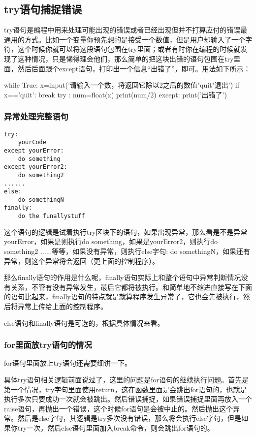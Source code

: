\documentclass[12pt,oneside]{book}
\begin{document}
\begin{common-format}
\subsection{try语句捕捉错误}
try语句是编程中用来处理可能出现的错误或者已经出现但并不打算应付的错误最通用的方式。比如一个变量你预先想的是接受一个数值，但是用户却输入了一个字符，这个时候你就可以将这段语句包围在try里面；或者有时你在编程的时候就发现了这种情况，只是懒得理会他们，那么简单的把这块出错的语句包围在try里面，然后后面跟个except语句，打印出一个信息“出错了”，即可。用法如下所示：
\begin{tcbpython}
while True:
    x=input('请输入一个数，将返回它除以2之后的数值"quit"退出\n')
    if x=='quit':
        break
    try :
        num=float(x)
        print(num/2)
    except:
        print('出错了')
\end{tcbpython}

\subsubsection{异常处理完整语句}
\begin{Verbatim}
try:
    yourCode
except yourError:
    do something
except yourError2:
    do something2
......
else:
    do somethingN
finally:
    do the funallystuff
\end{Verbatim}

这个语句的逻辑是试着执行try区块下的语句，如果出现异常，那么看是不是异常yourError，如果是则执行do something，如果是yourError2，则执行do something2 ......等等，如果没有异常，则执行else字句: do somethingN，如果还有异常，则这个异常将会返回（更上面的控制程序）。

那么finally语句的作用是什么呢，finally语句实际上和整个语句中异常判断情况没有关系，不管有没有异常发生，最后它都将被执行。和简单地不缩进直接写在下面的语句比起来，finally语句的特点就是就算程序发生异常了，它也会先被执行，然后将异常上传给上面的控制程序。

else语句和finally语句是可选的，根据具体情况来看。


\subsubsection{for里面放try语句的情况}
for语句里面放上try语句还需要细讲一下。

具体try语句相关逻辑前面说过了，这里的问题是for语句的继续执行问题。首先是第一个情况，try字句里面使用return，这在函数里面是会跳出for语句的，也就是执行多次只要成功一次就会被跳出。然后错误捕捉，如果错误捕捉里面再放入一个raise语句，再抛出一个错误，这个时候for语句是会被中止的。然后抛出这个异常。然后是else字句，其逻辑是try多次没有错误，那么将会执行else字句，但是如果你try一次，然后else语句里面加入break命令，则会跳出for语句的。


\end{common-format}
\end{document}
